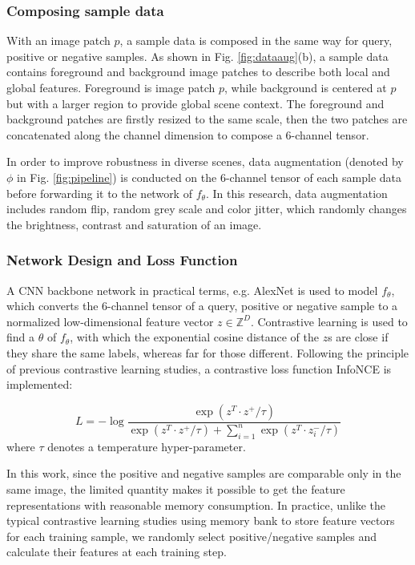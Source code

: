 \documentclass[letterpaper, 10 pt, conference]{ieeeconf}  %
\begin{document}
\subsubsection{Composing sample data}

With an image patch $p$, a sample data is composed in the same way for query, positive or negative samples.
As shown in Fig. \ref{fig:dataaug}(b), a sample data contains foreground and background image patches to describe both local and global features. Foreground is image patch $p$, while background is centered at $p$ but with a larger region to provide global scene context. The foreground and background patches are firstly resized to the same scale, then the two patches are concatenated along the channel dimension to compose a 6-channel tensor.

In order to improve robustness in diverse scenes, data augmentation (denoted by $\phi$ in Fig. \ref{fig:pipeline}) is conducted on the 6-channel tensor of each sample data before forwarding it to the network of $f_{\theta}$. In this research, data augmentation includes random flip, random grey scale and color jitter, which randomly changes the brightness, contrast and saturation of an image.

\subsubsection{Network Design and Loss Function}
A CNN backbone network in practical terms, e.g. AlexNet \cite{krizhevsky2012imagenet} is used to model $f_{\theta}$, which converts the 6-channel tensor of a query, positive or negative sample to a normalized low-dimensional feature vector $z\in \mathbb{Z}^D$.
Contrastive learning is used to find a $\theta$ of $f_{\theta}$, with which the exponential cosine distance of the $z$s are close if they share the same labels, whereas far for those different.
Following the principle of previous contrastive learning studies, a contrastive loss function InfoNCE \cite{oord2018representation} is implemented:

\begin{equation}\label{loss}
L=-\log {\dfrac{\exp (z^T \cdot z^+/\tau)}{\exp (z^T \cdot z^+/\tau)+\sum_{i=1}^{n}{\exp (z^T \cdot z_i^-/\tau)}}}
\end{equation}
where $\tau$ denotes a temperature hyper-parameter.

In this work, since the positive and negative samples are comparable only in the same image, the limited quantity makes it possible to get the feature representations with reasonable memory consumption. In practice, unlike the typical contrastive learning studies \cite{Wu_2018_CVPR} using memory bank to store feature vectors for each training sample, we randomly select positive/negative samples and calculate their features at each training step.
\end{document}
